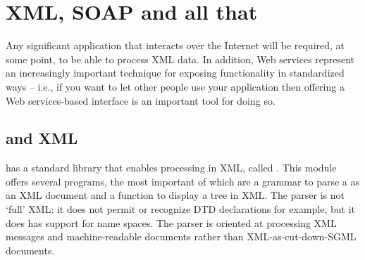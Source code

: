 \chapter{XML, SOAP and all that}
\label{soap}

Any significant application that interacts over the Internet will be required, at some point, to be able to process XML data. In addition, Web services represent an increasingly important technique for exposing functionality in standardized ways -- i.e., if you want to let other people use your application then offering a Web services-based interface is an important tool for doing so.

\section{\go and XML}
\label{xml:xml}
\go has a standard library that enables processing in XML, called . This module offers several programs, the most important of which are a grammar to parse a  as an XML document and a function to display a  tree in XML. The parser is not `full' XML: it does not permit or recognize DTD declarations for example, but it does has support for name spaces. The  parser is oriented at processing XML messages and machine-readable documents rather than XML-as-cut-down-SGML documents. 